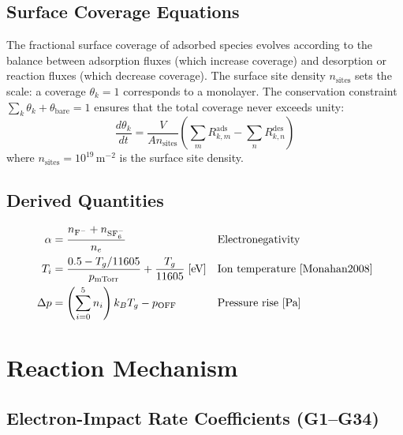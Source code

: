 \documentclass[11pt,a4paper]{report}
\begin{document}
\subsection{Surface Coverage Equations}
\label{sec:pure_surface_cov}

The fractional surface coverage of adsorbed species evolves according to the balance between adsorption fluxes (which increase coverage) and desorption or reaction fluxes (which decrease coverage).  The surface site density $n_\text{sites}$ sets the scale: a coverage $\theta_k = 1$ corresponds to a monolayer.  The conservation constraint $\sum_k \theta_k + \theta_\text{bare} = 1$ ensures that the total coverage never exceeds unity:
\begin{equation}
\frac{d\theta_k}{dt} = \frac{V}{An_\text{sites}}\left(\sum_m R^\text{ads}_{k,m} - \sum_n R^\text{des}_{k,n}\right)
\label{eq:pure_coverage}
\end{equation}
where $n_\text{sites} = 10^{19}$\,m$^{-2}$ is the surface site density.

\subsection{Derived Quantities}
\label{sec:pure_derived}

\begin{align}
\alpha &= \frac{n_{\text{F}^-} + n_{\text{SF}_6^-}}{n_e} && \text{Electronegativity} \label{eq:pure_alpha}\\
T_i &= \frac{0.5 - T_g/11605}{p_\text{mTorr}} + \frac{T_g}{11605} \;\text{[eV]} && \text{Ion temperature~\cite{Monahan2008}} \label{eq:pure_Ti}\\
\Delta p &= \left(\sum_{i=0}^{5} n_i\right) k_B T_g - p_\text{OFF} && \text{Pressure rise [Pa]} \label{eq:pure_dp}
\end{align}

\section{Reaction Mechanism}
\label{sec:pure_reactions}

\subsection{Electron-Impact Rate Coefficients (G1--G34)}
\label{sec:pure_eimpact}
\end{document}
